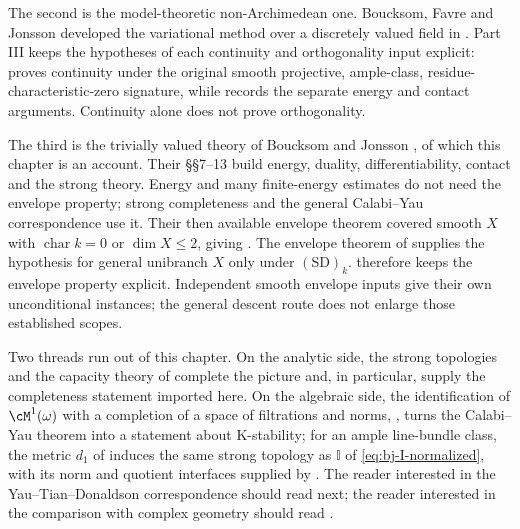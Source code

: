 The second is the model-theoretic non-Archimedean one. Boucksom, Favre
and Jonsson developed the variational method over a discretely valued
field in \cite{BFJ15,BFJ16}. Part III keeps the hypotheses of each
continuity and orthogonality input explicit:
 proves continuity under the original
smooth projective, ample-class, residue-characteristic-zero signature,
while  records the separate energy and
contact arguments. Continuity alone does not prove orthogonality.

The third is the trivially valued theory of Boucksom and Jonsson
\cite{BJ22}, of which this chapter is an account.  Their \S\S7--13 build energy, duality, differentiability, contact and
the strong theory. Energy and many finite-energy estimates do not need the
envelope property; strong completeness and the general Calabi--Yau
correspondence use it. Their then available envelope theorem covered
smooth $X$ with $\operatorname{char}k=0$ or $\dim X\le2$, giving
\cite[Theorem~12.9]{BJ22}.  The envelope theorem of
supplies the hypothesis for general unibranch $X$ only under
$\mathrm{(SD)}_k$.  therefore keeps the
envelope property explicit. Independent smooth envelope inputs give
their own unconditional instances; the general descent route does not
enlarge those established scopes.

Two threads run out of this chapter.  On the analytic side, the strong
topologies and the capacity theory of
 complete the picture and, in particular,
supply the completeness statement imported here.  On the algebraic side,
the identification of $\cM^1(\omega)$ with a completion of a space of
filtrations and norms, , turns the Calabi--Yau
theorem into a statement about K-stability; for an ample line-bundle class, the metric $d_1$ of
 induces the same strong topology
as $\mathbb I$ of \eqref{eq:bj-I-normalized}, with its norm and quotient
interfaces supplied by \cite{BJKS1}.  The reader interested in the
Yau--Tian--Donaldson correspondence should read
 next; the reader interested in the comparison with
complex geometry should read .
